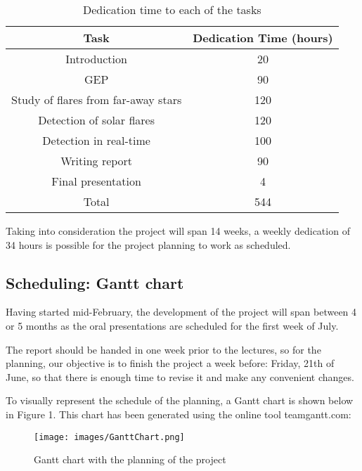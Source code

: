 \begin{table}[h!]
	\centering
	\begin{tabular}{||c c||} 
		\hline
		Task & Dedication Time (hours) \\ [0.5ex] 
		\hline\hline
		Introduction & 20  \\ 
		\hline
		GEP & 90  \\
		\hline
		Study of flares from far-away stars & 120 \\
		\hline
		Detection of solar flares & 120  \\
		\hline
		Detection in real-time & 100  \\ 
		\hline
		Writing report & 90  \\ 
		\hline
		Final presentation & 4 \\
		\hline\hline
		Total & 544  \\
		\hline
	\end{tabular}
	\caption{Dedication time to each of the tasks}
	\label{table:1}
\end{table}

Taking into consideration the project will span 14 weeks, a weekly dedication of 34 hours is possible for the project planning to work as scheduled.

\subsection{Scheduling: Gantt chart}

Having started mid-February, the development of the project will span between 4 or 5 months as the oral presentations are scheduled for the first week of July. 

The report should be handed in one week prior to the lectures, so for the planning, our objective is to finish the project a week before: Friday, 21th of June, so that there is enough time to revise it and make any convenient changes.

To visually represent the schedule of the planning, a Gantt chart is shown below in Figure 1. This chart has been generated using the online tool teamgantt.com: 

\vspace{0.25cm}

\begin{figure}[ht]
	\centering	
	\texttt{[image: images/GanttChart.png]}
	\caption{Gantt chart with the planning of the project }
\end{figure}
	

